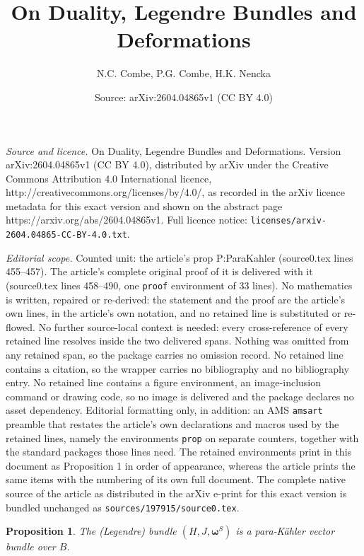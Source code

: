 \documentclass[10pt,a4paper]{amsart}
\title{On Duality, Legendre Bundles and Deformations}
\author{N.C. Combe, P.G. Combe, H.K. Nencka}
\date{Source: arXiv:2604.04865v1 (CC BY 4.0)}
\newtheorem{prop}{Proposition}
\begin{document}
\maketitle

\noindent\emph{Source and licence.} On Duality, Legendre Bundles and Deformations. Version arXiv:2604.04865v1 (CC BY 4.0), distributed by arXiv under the Creative Commons Attribution 4.0 International licence, http://creativecommons.org/licenses/by/4.0/, as recorded in the arXiv licence metadata for this exact version and shown on the abstract page https://arxiv.org/abs/2604.04865v1. Full licence notice: \texttt{licenses/arxiv-2604.04865-CC-BY-4.0.txt}.\par\smallskip

\noindent\textit{Editorial scope.} Counted unit: the article's prop P:ParaKahler (source0.tex lines 455--457). The article's complete original proof of it is delivered with it (source0.tex lines 458--490, one \texttt{proof} environment of 33 lines). No mathematics is written, repaired or re-derived: the statement and the proof are the article's own lines, in the article's own notation, and no retained line is substituted or re-flowed.  No further source-local context is needed: every cross-reference of every retained line resolves inside the two delivered spans.  Nothing was omitted from any retained span, so the package carries no omission record.  No retained line contains a citation, so the wrapper carries no bibliography and no bibliography entry.  No retained line contains a figure environment, an image-inclusion command or drawing code, so no image is delivered and the package declares no asset dependency.  Editorial formatting only, in addition: an AMS \texttt{amsart} preamble that restates the article's own declarations and macros used by the retained lines, namely the environments \texttt{prop} on separate counters, together with the standard packages those lines need.  The retained environments print in this document as Proposition 1 in order of appearance, whereas the article prints the same items with the numbering of its own full document.  The complete native source of the article as distributed in the arXiv e-print for this exact version is bundled unchanged as \texttt{sources/197915/source0.tex}.
\begin{prop}\label{P:ParaKahler}
The (Legendre) bundle $(H,J,\boldsymbol{\omega}^S)$ is a para‑Kähler vector bundle over $B$. 
\end{prop}
\end{document}
